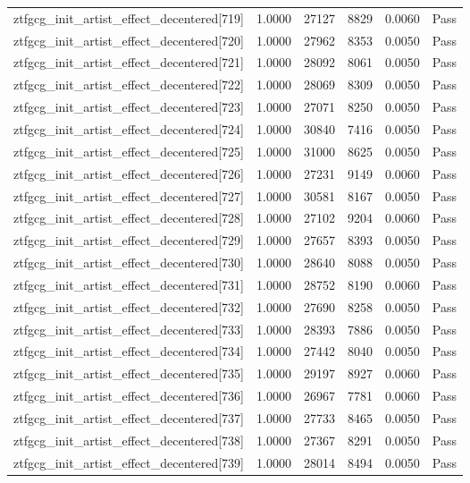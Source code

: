 \begin{table}[htbp]
\begin{tabular}{llrrll}
ztfgcg\_init\_artist\_effect\_decentered[719] & 1.0000 & 27127 & 8829 & 0.0060 & Pass \\
ztfgcg\_init\_artist\_effect\_decentered[720] & 1.0000 & 27962 & 8353 & 0.0050 & Pass \\
ztfgcg\_init\_artist\_effect\_decentered[721] & 1.0000 & 28092 & 8061 & 0.0050 & Pass \\
ztfgcg\_init\_artist\_effect\_decentered[722] & 1.0000 & 28069 & 8309 & 0.0050 & Pass \\
ztfgcg\_init\_artist\_effect\_decentered[723] & 1.0000 & 27071 & 8250 & 0.0050 & Pass \\
ztfgcg\_init\_artist\_effect\_decentered[724] & 1.0000 & 30840 & 7416 & 0.0050 & Pass \\
ztfgcg\_init\_artist\_effect\_decentered[725] & 1.0000 & 31000 & 8625 & 0.0050 & Pass \\
ztfgcg\_init\_artist\_effect\_decentered[726] & 1.0000 & 27231 & 9149 & 0.0060 & Pass \\
ztfgcg\_init\_artist\_effect\_decentered[727] & 1.0000 & 30581 & 8167 & 0.0050 & Pass \\
ztfgcg\_init\_artist\_effect\_decentered[728] & 1.0000 & 27102 & 9204 & 0.0060 & Pass \\
ztfgcg\_init\_artist\_effect\_decentered[729] & 1.0000 & 27657 & 8393 & 0.0050 & Pass \\
ztfgcg\_init\_artist\_effect\_decentered[730] & 1.0000 & 28640 & 8088 & 0.0050 & Pass \\
ztfgcg\_init\_artist\_effect\_decentered[731] & 1.0000 & 28752 & 8190 & 0.0060 & Pass \\
ztfgcg\_init\_artist\_effect\_decentered[732] & 1.0000 & 27690 & 8258 & 0.0050 & Pass \\
ztfgcg\_init\_artist\_effect\_decentered[733] & 1.0000 & 28393 & 7886 & 0.0050 & Pass \\
ztfgcg\_init\_artist\_effect\_decentered[734] & 1.0000 & 27442 & 8040 & 0.0050 & Pass \\
ztfgcg\_init\_artist\_effect\_decentered[735] & 1.0000 & 29197 & 8927 & 0.0060 & Pass \\
ztfgcg\_init\_artist\_effect\_decentered[736] & 1.0000 & 26967 & 7781 & 0.0060 & Pass \\
ztfgcg\_init\_artist\_effect\_decentered[737] & 1.0000 & 27733 & 8465 & 0.0050 & Pass \\
ztfgcg\_init\_artist\_effect\_decentered[738] & 1.0000 & 27367 & 8291 & 0.0050 & Pass \\
ztfgcg\_init\_artist\_effect\_decentered[739] & 1.0000 & 28014 & 8494 & 0.0050 & Pass \\

\end{tabular}
\end{table}
